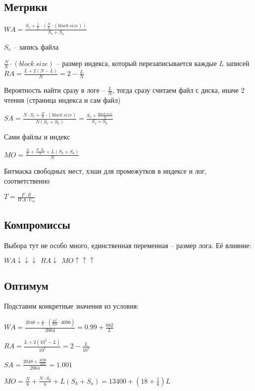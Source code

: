 	\subsection*{Метрики}
	
	\large$WA = \frac{S_v + \frac{1}{L}\cdot(\frac{N}{b}\cdot (block\ size))}{S_v + S_k}$\normalsize
	
	$S_v$ -- запись файла
	
	$\frac{N}{b}\cdot (block\ size)$ -- размер индекса, который перезаписывается каждые $L$ записей\\
	
	\large$RA = \frac{L + 2(N-L)}{N} = 2 - \frac{L}{N}$\normalsize
	
	Вероятность найти сразу в логе -- $\frac{L}{N}$, тогда сразу считаем файл с диска, иначе 2 чтения (страница индекса и сам файл)
	
	\large$SA = \frac{N\cdot S_v + \frac{N}{b}\cdot (block\ size)}{N(S_v + S_k)} = \frac{S_v + \frac{block\ size}{b}}{S_v + S_k}$\normalsize
	
	Сами файлы и индекс

	\large$MO = \frac{\frac{N}{8} + \frac{N\cdot S_h}{b} + L(S_k + S_o)}{N}$\normalsize
	
	Битмаска свободных мест, хэши для промежутков в индексе и лог, соответственно
	
	\large$T = \frac{F\cdot E}{WA\cdot U_w}$\normalsize
	
	\subsection*{Компромиссы}
	
	Выбора тут не особо много, единственная переменная -- размер лога. Её влияние:
	
	$WA\downarrow\downarrow\downarrow\ \ RA \downarrow\ \ MO \uparrow\uparrow\uparrow$

	\subsection*{Оптимум}
	
	Подставим конкретные значения из условия:
	
	\large$WA = \frac{2048 + \frac{1}{L}\cdot(\frac{10^5}{225}\cdot 4096)}{2064} = 0.99 + \frac{882}{L}$\normalsize
	
	\large$RA = \frac{L + 2(10^5-L)}{10^5} = 2 - \frac{L}{10^5}$\normalsize
	
	\large$SA = \frac{2048 + \frac{4096}{225}}{2064} = 1.001$\normalsize
		
	\large$MO = \frac{N}{8} + \frac{N\cdot S_h}{b} + L(S_k + S_o) = 13400 + (18+\frac{1}{8})L$\normalsize
